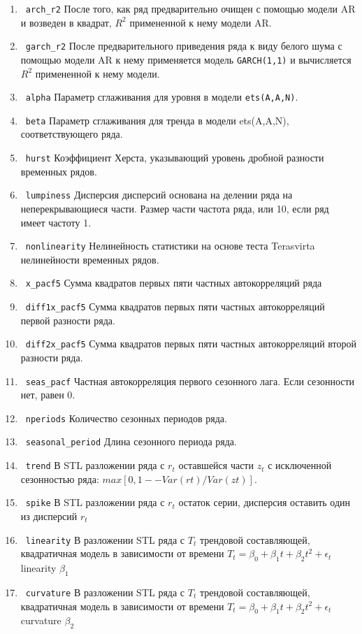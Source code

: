 \documentclass[a4paper,12pt]{article}
\theoremstyle{plain} %
\theoremstyle{definition} %
\theoremstyle{remark} %
\begin{document}
\begin{enumerate}
      \item \verb|arch_r2|  После того, как ряд предварительно очищен с помощью модели AR и возведен в квадрат, $R^2$ примененной к нему модели AR.
      \item \verb|garch_r2|  После предварительного приведения ряда к виду белого шума с помощью модели AR к нему применяется модель \verb|GARCH(1,1)| и вычисляется $R^2$ примененной к нему модели.
      \item \verb|alpha| Параметр сглаживания для уровня в модели \verb|ets(A,A,N)|.
      \item \verb|beta| Параметр сглаживания для тренда в модели ets(A,A,N), соответствующего ряда.
      \item \verb|hurst|  Коэффициент Херста, указывающий уровень дробной разности временных рядов.
      \item \verb|lumpiness|  Дисперсия дисперсий основана на делении ряда на неперекрывающиеся части. Размер части частота ряда, или 10, если ряд имеет частоту 1.
      \item \verb|nonlinearity|  Нелинейность статистики на основе теста Terasvirta нелинейности временных рядов.
      \item \verb|x_pacf5| Сумма квадратов первых пяти частных автокорреляций ряда
      \item \verb|diff1x_pacf5|  Сумма квадратов первых пяти частных автокорреляций первой разности ряда.
      \item \verb|diff2x_pacf5|  Сумма квадратов первых пяти частных автокорреляций второй разности ряда.
      \item \verb|seas_pacf| Частная автокорреляция первого сезонного лага. Если сезонности нет, равен 0.
      \item \verb|nperiods|  Количество сезонных периодов ряда.
      \item \verb|seasonal_period|  Длина сезонного периода ряда.
      \item \verb|trend|  В STL разложении  ряда с $r_t$ оставшейся части $z_t$ с исключенной сезонностью ряда: $max[0,1 -- Var(rt)/Var(zt)]$.
      \item \verb|spike|  В  STL разложении ряда с $r_t$ остаток серии, дисперсия оставить один из дисперсий $r_t$
      \item \verb|linearity|  В разложении STL ряда с $T_t$ трендовой составляющей, квадратичная модель в зависимости от времени $T_t = \beta_{0} + \beta_{1}t + \beta_{2}t^2 + \epsilon_t$ linearity $\beta_1$
      \item \verb|curvature|  В разложении STL ряда с $T_t$ трендовой составляющей, квадратичная модель в зависимости от времени $T_t = \beta_{0} + \beta_{1}t + \beta_{2}t^2 + \epsilon_t$ curvature $\beta_2$

\end{enumerate}
\end{document}
